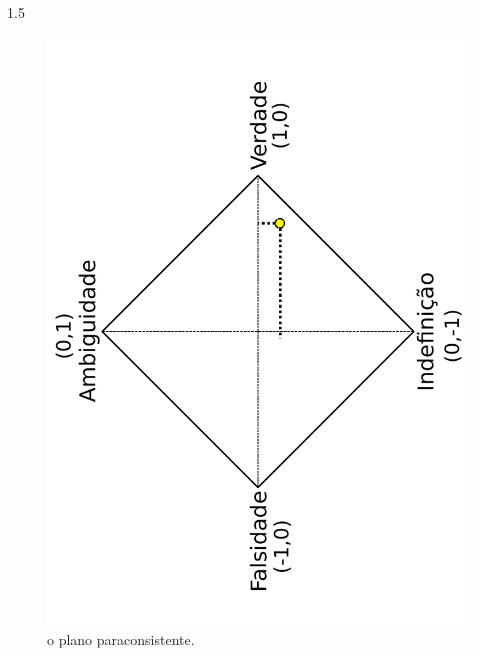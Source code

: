 \documentclass[a4paper,12pt,openright,oneside]{book}
\newenvironment{myenv}[1]
{\begin{spacing}{#1}}
	{\end{spacing}}
\begin{document}
\begin{myenv}{1.5}
\begin{figure}[H]
\centering					\includegraphics[width=0.69\linewidth]{images/paraconsistentPlane.pdf}
\caption{o plano paraconsistente.}
\label{fig:paraconsistentplane}
\end{figure}

\end{myenv}
\end{document}
